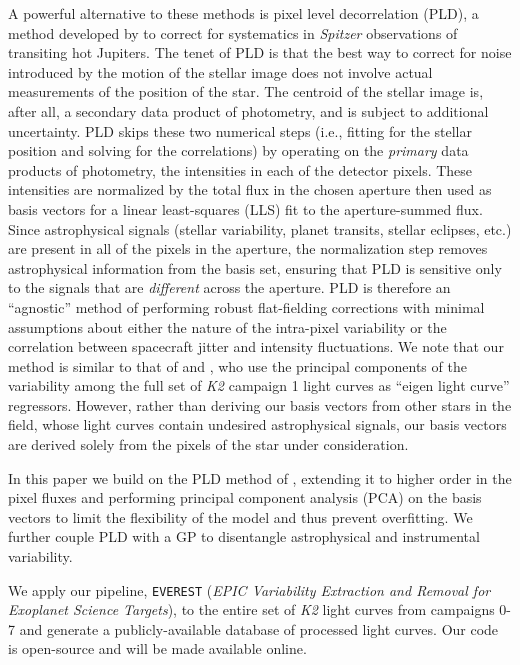 \documentclass[]{emulateapj}
\begin{document}
A powerful alternative to these methods is pixel level decorrelation (PLD), a method developed
by \cite{DEM15} to correct for systematics in \emph{Spitzer} observations of transiting
hot Jupiters. The tenet of PLD is that the best way to correct for noise introduced by
the motion of the stellar image does not involve actual measurements of the position
of the star. The centroid of the stellar image is, after all, a secondary data product
of photometry, and is subject to additional uncertainty.
PLD skips these two numerical steps (i.e., fitting for the stellar position and solving
for the correlations) by operating on the \emph{primary} data products of photometry, the
intensities in each of the detector pixels. 
These intensities are normalized by the
total flux in the chosen aperture then used as basis vectors for a linear least-squares 
(LLS) fit to the aperture-summed flux. Since astrophysical signals (stellar variability,
planet transits, stellar eclipses, etc.) are present in all of the pixels in the aperture,
the normalization step removes astrophysical information from the basis set, ensuring
that PLD is sensitive only to the signals that are \emph{different} across the aperture. PLD is
therefore an ``agnostic'' method of performing robust flat-fielding corrections with
minimal assumptions about either the nature of the intra-pixel variability or the correlation 
between spacecraft jitter and intensity fluctuations. We note that our method is similar 
to that of \cite{DFM15} and \cite{MON15}, who use the principal components of the variability 
among the full set of \emph{K2} campaign 1 light curves as ``eigen light curve'' regressors.
However, rather than deriving our basis vectors from other stars in the field, whose
light curves contain undesired astrophysical signals, our basis vectors are derived
solely from the pixels of the star under consideration.

In this paper we build on the PLD method of \cite{DEM15}, extending it to higher order
in the pixel fluxes and performing principal component analysis (PCA) on the basis
vectors to limit the flexibility of the model and thus prevent overfitting. We further 
couple PLD with a GP to 
disentangle astrophysical and instrumental variability. 

We apply our pipeline, \texttt{EVEREST}
(\emph{EPIC Variability Extraction and Removal for
Exoplanet Science Targets}), to the entire set of \emph{K2} light curves from campaigns 0-7 and generate a 
publicly-available database of processed light curves. Our code is open-source and will be made
available online.
\end{document}
